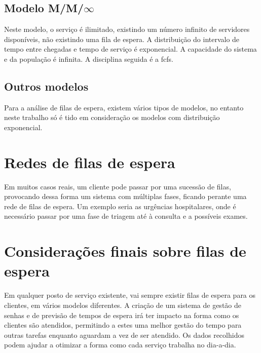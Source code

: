 \subsection{Modelo M/M/$\infty$}
Neste modelo, o serviço é ilimitado, existindo um número infinito de servidores disponíveis, não existindo uma fila de espera. A distribuição do intervalo de tempo entre chegadas e tempo de serviço é exponencial. A capacidade do sistema e da população é infinita. A disciplina seguida é a \acrshort{fcfs}.

\subsection{Outros modelos}
Para a análise de filas de espera, existem vários tipos de modelos, no entanto neste trabalho só é tido em consideração os modelos com distribuição exponencial.

\section{Redes de filas de espera}
Em muitos casos reais, um cliente pode passar por uma sucessão de filas, provocando dessa forma um sistema com múltiplas fases, ficando perante uma rede de filas de espera. Um exemplo seria as urgências hospitalares, onde é necessário passar por uma fase de triagem até à consulta e a possíveis exames. 

\section{Considerações finais sobre filas de espera}
Em qualquer posto de serviço existente, vai sempre existir filas de espera para os clientes, em vários modelos diferentes. A criação de um sistema de gestão de senhas e de previsão de tempos de espera irá ter impacto na forma como os clientes são atendidos, permitindo a estes uma melhor gestão do tempo para outras tarefas enquanto aguardam a vez de ser atendido. Os dados recolhidos podem ajudar a otimizar a forma como cada serviço trabalha no dia-a-dia.
